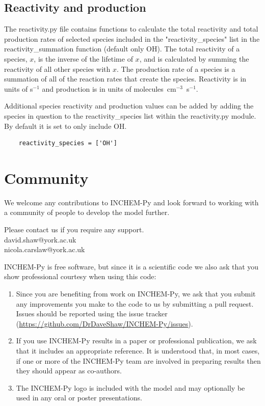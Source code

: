\documentclass[a4paper]{refart}
\begin{document}
\subsection{Reactivity and production}\label{reactivity.py}
The reactivity.py file contains functions to calculate the total reactivity and total production rates of selected species included in the "reactivity\_species" list in the reactivity\_summation function (default only OH). The total reactivity of a species, $x$, is the inverse of the lifetime of $x$, and is calculated by summing the reactivity of all other species with $x$. The production rate of a species is a summation of all of the reaction rates that create the species. Reactivity is in units of s$^{-1}$ and production is in units of molecules~cm$^{-3}$~s$^{-1}$.

Additional species reactivity and production values can be added by adding the species in question to the reactivity\_species list within the reactivity.py module. By default it is set to only include OH.
\begin{verbatim}
    reactivity_species = ['OH']
\end{verbatim}

\section{Community}
We welcome any contributions to INCHEM-Py and look forward to working with a community of people to develop the model further. 

Please contact us if you require any support.\\
david.shaw@york.ac.uk\\
nicola.carslaw@york.ac.uk

INCHEM-Py is free software, but since it is a scientific code we also ask that you show professional courtesy when using this code:
\begin{enumerate}
    \item Since you are benefiting from work on INCHEM-Py, we ask that you submit any improvements you make to the code to us by submitting a pull request. Issues should be reported using the issue tracker (\url{https://github.com/DrDaveShaw/INCHEM-Py/issues}).
    \item If you use INCHEM-Py results in a paper or professional publication, we ask that it includes an appropriate reference. It is understood that, in most cases, if one or more of the INCHEM-Py team are involved in preparing results then they should appear as co-authors.
    \item The INCHEM-Py logo is included with the model and may optionally be used in any oral or poster presentations.
\end{enumerate}
\end{document}
